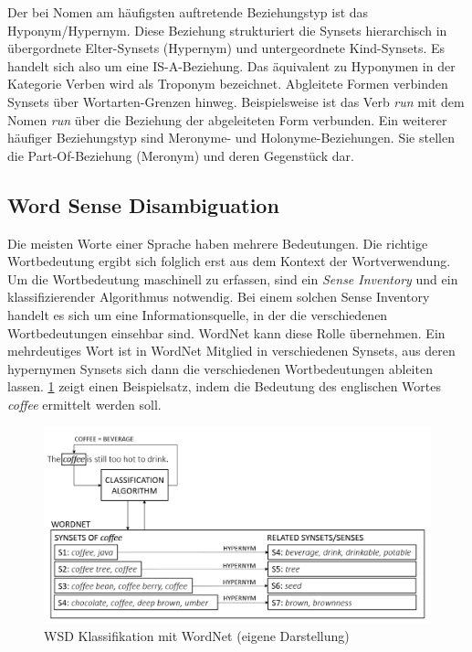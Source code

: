 Der bei Nomen am häufigsten auftretende Beziehungstyp ist das Hyponym/Hypernym. Diese Beziehung strukturiert die Synsets hierarchisch in übergordnete Elter-Synsets (Hypernym) und untergeordnete Kind-Synsets. Es handelt sich also um eine IS-A-Beziehung. Das äquivalent zu Hyponymen in der Kategorie Verben wird als Troponym bezeichnet. Abgleitete Formen verbinden Synsets über Wortarten-Grenzen hinweg. Beispielsweise ist das Verb \textit{run} mit dem Nomen \textit{run} über die Beziehung der abgeleiteten Form verbunden. Ein weiterer häufiger Beziehungstyp sind Meronyme- und Holonyme-Beziehungen. Sie stellen die Part-Of-Beziehung (Meronym) und deren Gegenstück dar.

\par
\subsection{Word Sense Disambiguation}

Die meisten Worte einer Sprache haben mehrere Bedeutungen. Die richtige Wortbedeutung ergibt sich folglich erst aus dem Kontext der Wortverwendung. Um die Wortbedeutung maschinell zu erfassen, sind ein \textit{Sense Inventory} und ein klassifizierender Algorithmus notwendig. Bei einem solchen Sense Inventory handelt es sich um eine Informationsquelle, in der die verschiedenen Wortbedeutungen einsehbar sind. WordNet kann diese Rolle übernehmen. Ein mehrdeutiges Wort ist in WordNet Mitglied in verschiedenen Synsets, aus deren hypernymen Synsets sich dann die verschiedenen Wortbedeutungen ableiten lassen. \ref{fig:WSD} zeigt einen Beispielsatz, indem die Bedeutung des englischen Wortes \textit{coffee} ermittelt werden soll.
\par 

\begin{figure}
\includegraphics[width=15cm]{pictures/WSD.png}
\caption{WSD Klassifikation mit WordNet (eigene Darstellung)}
\label{fig:WSD}
\end{figure}

